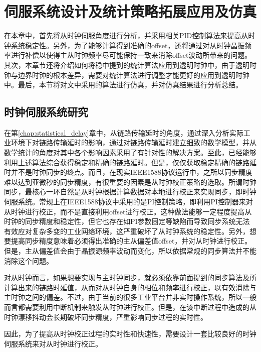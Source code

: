 
\chapter{伺服系统设计及统计策略拓展应用及仿真}
在本章中，首先将从时钟伺服角度进行分析，并采用相关PID控制算法来提高从时钟系统稳定性。另外，为了能够计算得到准确的offset，还将通过对从时钟晶振频率进行补偿以使得主从时钟频率尽可能保持一致来消除offset波动所带来的问题。其次，本章节还将介绍如何将稳中提到的统计算法应用到透明时钟中，由于透明时钟与边界时钟的根本差异，需要对统计算法进行调整才能更好的应用到透明时钟中。最后，本节将对文中采用的算法进行仿真，并对仿真结果进行分析总结。

\section{时钟伺服系统研究}
在第\ref{chap:statistical_delay}章中，从链路传输延时的角度，通过深入分析实际工业环境下对链路传输延时的影响，通过对链路传输延时建立细致的数学模型，并从数学统计的角度对其中各个影响因素采用了有针对性的解决方案。至此，已经能够利用上述算法综合获得稳定和精确的链路延时。但是，仅仅获取稳定精确的链路延时并不是时钟同步的终点。而且，在现实IEEE1588协议运行中，之所以同步精度难以达到亚微秒的同步精度，有很重要的因素是从时钟校正策略的选取。所谓时钟同步，最核心一环自然是从时钟根据计算数据对本地进行校正来实现同步，即时钟伺服系统。常规上在IEEE1588协议中采用的是PI控制策略，即利用PI控制器来对从时钟进行校正，而不是直接利用offset进行校正。这种做法能够一定程度提高从时钟的同步精度和稳定性，但它也存在如PI参数固定等缺陷而导致同步系统无法有效应对复杂多变的工业网络环境，这严重破坏了从时钟系统的稳定性。另外，想要提高同步精度意味着必须得出准确的主从偏差值offset，并对从时钟进行校正。但是，主从偏差值会由于晶振源频率波动而变化，所以依据常规的同步算法并不能消除这个问题。

对从时钟而言，如果想要实现与主时钟同步，就必须依靠前面提到的同步算法及所计算出来的链路时延值，从而对从时钟自身的相位和频率进行校正，以有效消除与主时钟之间的偏差。不过，由于当前的很多工业平台并非实时操作系统，所以一般而言都需要利用中断机制来触发从时钟进行校正。但是，在该中断过程中造成的从时钟漂移抖动会长期破坏同步精度，严重影响同步过程的实时性。

因此，为了提高从时钟校正过程的实时性和快速性，需要设计一套比较良好的时钟伺服系统来对从时钟进行校正。


